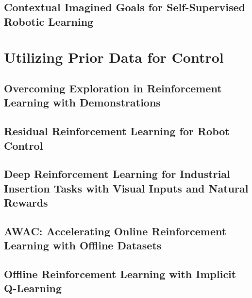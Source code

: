 \documentclass[ titlepage,numbers=noenddot,headinclude,
                footinclude=true,cleardoublepage=empty,abstractoff,
                BCOR=5mm,paper=letter,fontsize=12pt,
                american,
                openany
                ]{scrreprt}
\begin{document}
\chapter{Contextual Imagined Goals for Self-Supervised Robotic Learning}\label{chapter:ccrig}

\part{Utilizing Prior Data for Control}

 \chapter{Overcoming Exploration in Reinforcement Learning with Demonstrations}\label{chapter:bcddpg}

 \chapter{Residual Reinforcement Learning for Robot Control}\label{chapter:residualrl}

 \chapter{Deep Reinforcement Learning for Industrial Insertion Tasks with Visual Inputs and Natural Rewards}\label{chapter:insertion}

\chapter{AWAC: Accelerating Online Reinforcement Learning with Offline Datasets}\label{chapter:awac}

\chapter{Offline Reinforcement Learning with Implicit Q-Learning}\label{chapter:iql}

\end{document}
